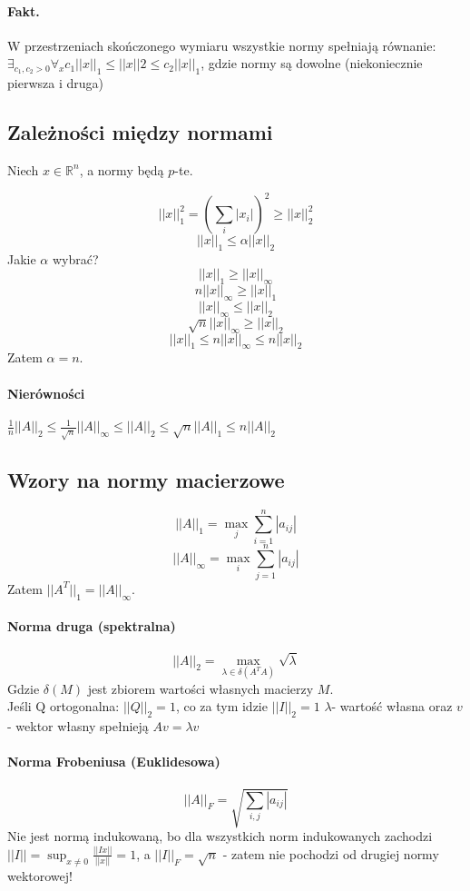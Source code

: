 \documentclass{article}
\begin{document}
\paragraph{Fakt.} W przestrzeniach skończonego wymiaru wszystkie normy spełniają równanie:
$ \exists_{c_1, c_2>0}\forall_{x}c_1||x||_1\leq||x||2\leq c_2||x||_1 $, gdzie normy są dowolne (niekoniecznie pierwsza i druga)

\subsection{Zależności między normami}
Niech $ x\in\mathbb{R}^n $, a normy będą $p$-te.

$$ ||x||^2_1=(\sum_i|x_i|)^2 \ge ||x||_2^2$$
$$ ||x||_1\le \alpha||x||_2 $$
Jakie $\alpha$ wybrać?
$$ ||x||_1\ge ||x||_\infty $$
$$ n||x||_\infty\ge ||x||_1 $$
$$ ||x||_\infty\le ||x||_2 $$
$$ \sqrt n||x||_\infty\ge ||x||_2 $$
$$ ||x||_1\leq n||x||_\infty\leq n||x||_2 $$
Zatem $\alpha=n$.
\paragraph{Nierówności}
$ \frac1n ||A||_2\le\frac1{\sqrt n}||A||_\infty\le||A||_2\le\sqrt{n} ||A||_1\le n||A||_2$
\subsection{Wzory na normy macierzowe}
$$ ||A||_1=\max_j\sum_{i=1}^{n} |a_{ij}|$$
$$ ||A||_\infty=\max_i\sum_{j=1}^{n} |a_{ij}|$$
Zatem $ ||A^T||_1=||A||_\infty $.\\
\paragraph{Norma druga (spektralna)}
$$||A||_2=\max_{\lambda\in\delta(A^TA)}\sqrt{\lambda}$$
Gdzie $ \delta(M) $ jest zbiorem wartości własnych macierzy $ M $.\\
Jeśli Q ortogonalna: $||Q||_2=1$, co za tym idzie $ ||I||_2=1 $
$ \lambda $- wartość własna oraz $ v $ - wektor własny spełnieją $ Av=\lambda v $
\paragraph{Norma Frobeniusa (Euklidesowa)}
$$ ||A||_F = \sqrt{\sum_{i,j}|a_{ij}|} $$
Nie jest normą indukowaną, bo dla wszystkich norm indukowanych zachodzi $ ||I||=\sup_{x\not=0}\frac{||Ix||}{||x||}=1 $, a 
$ ||I||_F=\sqrt{n} $ - zatem nie pochodzi od drugiej normy wektorowej!
\end{document}
